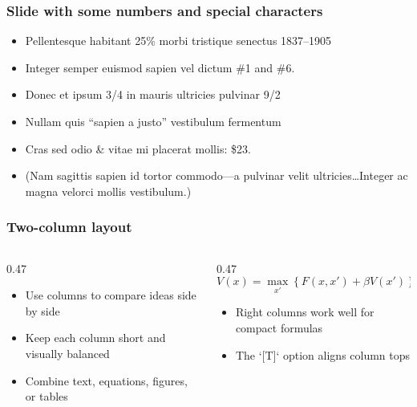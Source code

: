 \expandafter\documentclass\expandafter[\presentationclassoptions]{beamer}
\begin{document}
\begin{frame}
\end{frame}

\begin{frame}
  \frametitle{Slide with some numbers and special characters}
  \begin{itemize}
    \item Pellentesque habitant 25\% morbi tristique senectus 1837--1905
    \item Integer semper euismod sapien vel dictum \#1 and \#6.
    \item  Donec et ipsum 3/4 in mauris ultricies pulvinar 9/2
    \item Nullam quis ``sapien a justo'' vestibulum fermentum
    \item Cras sed odio \& vitae mi placerat mollis: \$23.
    \item (Nam sagittis sapien id tortor commodo---a pulvinar velit ultricies\ldots Integer ac magna velorci mollis vestibulum.)
  \end{itemize}
\end{frame}

\begin{frame}
  \frametitle{Two-column layout}
  \begin{columns}[T,onlytextwidth]
    \begin{column}{0.47\textwidth}
      \begin{itemize}
        \item Use columns to compare ideas side by side
        \item Keep each column short and visually balanced
        \item Combine text, equations, figures, or tables
      \end{itemize}
    \end{column}
    \begin{column}{0.47\textwidth}
      \small
      \begin{equation*}
        V(x)=\max_{x'}\left\{F(x, x') +\beta V(x')\right\}
      \end{equation*}
      \vspace{-2mm}
      \begin{itemize}
        \item Right columns work well for compact formulas
        \item The `[T]` option aligns column tops
      \end{itemize}
    \end{column}
  \end{columns}
\end{frame}
\end{document}

